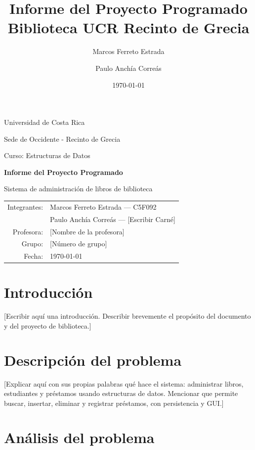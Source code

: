\documentclass[11pt]{article}
\title{Informe del Proyecto Programado\\Biblioteca UCR Recinto de Grecia}
\author{Marcos Ferreto Estrada \and Paulo Anchía Correás}
\date{\today}
\begin{document}
\begin{titlepage}
    \centering
    {\Large Universidad de Costa Rica\par}
    {\large Sede de Occidente - Recinto de Grecia\par}
    {\large Curso: Estructuras de Datos\par}

    \vspace{2.5cm}
    {\LARGE\bfseries Informe del Proyecto Programado\par}
    {\Large Sistema de administración de libros de biblioteca\par}

    \vspace{2.5cm}
    \begin{tabular}{rl}
        Integrantes: & Marcos Ferreto Estrada --- C5F092 \\
                     & Paulo Anchía Correás --- [Escribir Carné] \\
        Profesora:   & [Nombre de la profesora] \\
        Grupo:       & [Número de grupo] \\
        Fecha:       & \today \\
    \end{tabular}

    \vfill
\end{titlepage}

\tableofcontents
\newpage

\section{Introducción}

[Escribir aquí una introducción. Describir brevemente el propósito del documento y del proyecto de biblioteca.]

\section{Descripción del problema}

[Explicar aquí con sus propias palabras qué hace el sistema: administrar libros, estudiantes y préstamos usando estructuras de datos. Mencionar que permite buscar, insertar, eliminar y registrar préstamos, con persistencia y GUI.]

\section{Análisis del problema}
\end{document}
